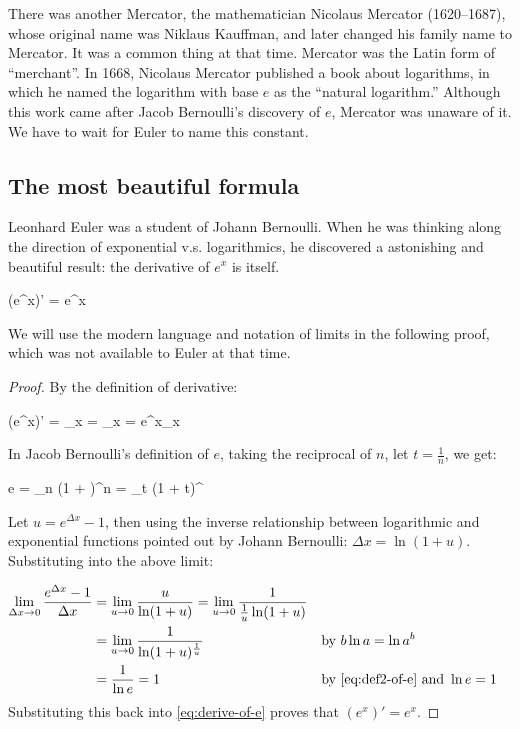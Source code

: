 \documentclass[b5paper]{article}
\begin{document}
There was another Mercator, the mathematician Nicolaus Mercator (1620–1687), whose original name was Niklaus Kauffman, and later changed his family name to Mercator. It was a common thing at that time. Mercator was the Latin form of \enquote{merchant}. In 1668, Nicolaus Mercator published a book about logarithms, in which he named the logarithm with base $e$ as the \enquote{natural logarithm.} Although this work came after Jacob Bernoulli's discovery of $e$, Mercator was unaware of it. We have to wait for Euler to name this constant.

\subsection{The most beautiful formula}
Leonhard Euler was a student of Johann Bernoulli. When he was thinking along the direction of exponential v.s. logarithmics, he discovered a astonishing and beautiful result: the derivative of $e^x$ is itself.

\be
(e^x)' = e^x
\ee

We will use the modern language and notation of limits in the following proof, which was not available to Euler at that time.

\begin{proof}
By the definition of derivative:

\be \label{eq:derive-of-e}
(e^x)' = \lim_{\Delta x }  = \lim_{\Delta x }  = e^x\lim_{\Delta x } 
\ee

In Jacob Bernoulli's definition of $e$, taking the reciprocal of $n$, let $t = \frac{1}{n}$, we get:

\be \label{eq:def2-of-e}
e = \lim_{n \to \infty} (1 + )^n = \lim_{t } (1 + t)^{}
\ee

Let $u = e^{\Delta x} - 1$, then using the inverse relationship between logarithmic and exponential functions pointed out by Johann Bernoulli: $\Delta x = \ln (1 + u)$. Substituting into the above limit:

\begin{align*}
\lim_{\Delta x \to 0} \frac{e^{\Delta x} - 1}{\Delta x} &= \lim_{u \to 0} \frac{u}{\ln (1 + u)} = \lim_{u \to 0} \frac{1}{\frac{1}{u}\ln (1 + u)} \\
  &= \lim_{u \to 0} \frac{1}{\ln (1 + u)^{\frac{1}{u}}} && \text{by } b \ln a = \ln a^b \\
  &= \frac{1}{\ln e} = 1 && \text{by \cref{eq:def2-of-e} and } \ln e = 1
\end{align*}
Substituting this back into \cref{eq:derive-of-e} proves that $(e^x)' = e^x$.
\end{proof}
\end{document}
